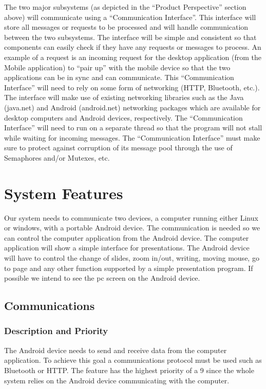 \documentclass{article}
\begin{document}
The two major subsystems (as depicted in the “Product Perspective” section above) will communicate using a “Communication Interface”. This interface will store all messages or requests to be processed and will handle communication between the two subsystems. The interface will be simple and consistent so that components can easily check if they have any requests or messages to process. An example of a request is an incoming request for the desktop application (from the Mobile application) to “pair up” with the mobile device so that the two applications can be in sync and can communicate.
This “Communication Interface” will need to rely on some form of networking (HTTP, Bluetooth, etc.). The interface will make use of existing networking libraries such as the Java (java.net) and Android (android.net) networking packages which are available for desktop computers and Android devices, respectively. The “Communication Interface” will need to run on a separate thread so that the program will not stall while waiting for incoming messages. The “Communication Interface” must make sure to protect against corruption of its message pool through the use of Semaphores and/or Mutexes, etc.


\newpage
\section{System Features}
Our system needs to communicate two devices, a computer running either Linux or windows, with a portable Android device. 
The communication is needed so we can control the computer application from the Android device. 
The computer application will show a simple interface for presentations. 
The Android device will have to control the change of slides, zoom in/out, writing, moving mouse, go to page and any other function supported by a simple presentation program. 
If possible we intend to see the pc screen on the Android device. 

\subsection{Communications}
\subsubsection{Description and Priority}
The Android device needs to send and receive data from the computer application. 
To achieve this goal a communications protocol must be used such as Bluetooth or HTTP. 
The feature has the highest priority of a 9 since the whole system relies on the Android device communicating with the computer.
\end{document}
